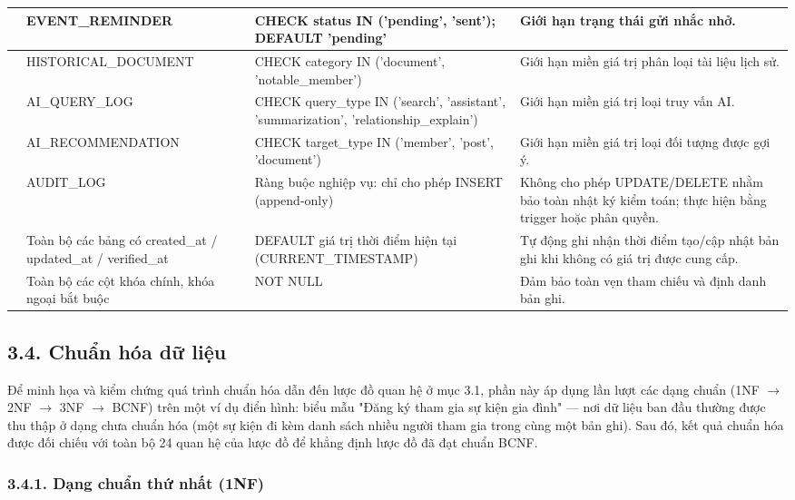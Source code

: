 \begin{small}
\begin{longtable}{|>{\centering\arraybackslash}p{0.6cm}|>{\raggedright\arraybackslash}p{3.2cm}|>{\raggedright\arraybackslash}p{4.4cm}|>{\raggedright\arraybackslash}p{4.4cm}|}
		14 & EVENT\_\allowbreak REMINDER & CHECK status IN ('pending', 'sent'); DEFAULT 'pending' & Giới hạn trạng thái gửi nhắc nhở. \\ \hline
		15 & HISTORICAL\_\allowbreak DOCUMENT & CHECK category IN ('document', 'notable\_member') & Giới hạn miền giá trị phân loại tài liệu lịch sử. \\ \hline
		16 & AI\_\allowbreak QUERY\_\allowbreak LOG & CHECK query\_type IN ('search', 'assistant', 'summarization', 'relationship\_explain') & Giới hạn miền giá trị loại truy vấn AI. \\ \hline
		17 & AI\_\allowbreak RECOM\allowbreak MENDATION & CHECK target\_type IN ('member', 'post', 'document') & Giới hạn miền giá trị loại đối tượng được gợi ý. \\ \hline
		18 & AUDIT\_\allowbreak LOG & Ràng buộc nghiệp vụ: chỉ cho phép INSERT (append-only) & Không cho phép UPDATE/DELETE nhằm bảo toàn nhật ký kiểm toán; thực hiện bằng trigger hoặc phân quyền. \\ \hline
		19 & Toàn bộ các bảng có created\_at / updated\_at / verified\_at & DEFAULT giá trị thời điểm hiện tại (CURRENT\_TIMESTAMP) & Tự động ghi nhận thời điểm tạo/cập nhật bản ghi khi không có giá trị được cung cấp. \\ \hline
		20 & Toàn bộ các cột khóa chính, khóa ngoại bắt buộc & NOT NULL & Đảm bảo toàn vẹn tham chiếu và định danh bản ghi. \\ \hline
	\end{longtable}
\end{small}

\subsection{3.4. Chuẩn hóa dữ liệu}
\label{sec:chuan_hoa_du_lieu}

Để minh họa và kiểm chứng quá trình chuẩn hóa dẫn đến lược đồ quan hệ ở mục 3.1, phần này áp dụng lần lượt các dạng chuẩn (1NF $\rightarrow$ 2NF $\rightarrow$ 3NF $\rightarrow$ BCNF) trên một ví dụ điển hình: biểu mẫu "Đăng ký tham gia sự kiện gia đình" --- nơi dữ liệu ban đầu thường được thu thập ở dạng chưa chuẩn hóa (một sự kiện đi kèm danh sách nhiều người tham gia trong cùng một bản ghi). Sau đó, kết quả chuẩn hóa được đối chiếu với toàn bộ 24 quan hệ của lược đồ để khẳng định lược đồ đã đạt chuẩn BCNF.

\subsubsection{3.4.1. Dạng chuẩn thứ nhất (1NF)}

